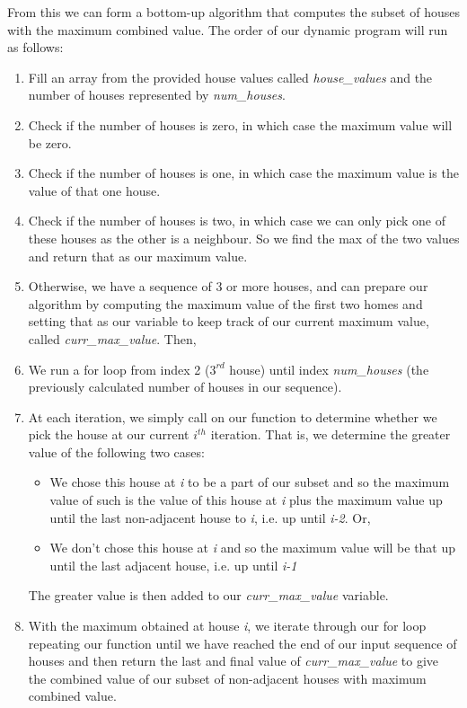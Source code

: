 \documentclass[11pt, oneside]{article}   	%
\begin{document}
\begin{enumerate}
\begin{enumerate}
		From this we can form a bottom-up algorithm that computes the subset of houses with the maximum combined value. The order of our dynamic program will run as follows:
		\begin{enumerate}
			\item Fill an array from the provided house values called \textit{house\_values} and the number of houses represented by \textit{num\_houses}.
			\item Check if the number of houses is zero, in which case the maximum value will be zero.
			\item Check if the number of houses is one, in which case the maximum value is the value of that one house.
			\item Check if the number of houses is two, in which case we can only pick one of these houses as the other is a neighbour. So we find the max of the two values and return that as our maximum value.
			\newpage
			\item Otherwise, we have a sequence of 3 or more houses, and can prepare our algorithm by computing the maximum value of the first two homes and setting that as our variable to keep track of our current maximum value, called \textit{curr\_max\_value}. Then,
			\item We run a for loop from index 2 ($3^{rd}$ house) until index \textit{num\_houses} (the previously calculated number of houses in our sequence).
			\item At each iteration, we simply call on our function to determine whether we pick the house at our current $i^{th}$ iteration. That is, we determine the greater value of the following two cases:
			\begin{itemize}
				\item We chose this house at \textit{i} to be a part of our subset and so the maximum value of such is the value of this house at \textit{i} plus the maximum value up until the last non-adjacent house to \textit{i}, i.e. up until \textit{i-2}. Or,
				\item We don't chose this house at \textit{i} and so the maximum value will be that up until the last adjacent house, i.e. up until \textit{i-1}
			\end{itemize}
			The greater value is then added to our \textit{curr\_max\_value} variable.
			\item With the maximum obtained at house \textit{i}, we iterate through our for loop repeating our function until we have reached the end of our input sequence of houses and then return the last and final value of \textit{curr\_max\_value} to give the combined value of our subset of non-adjacent houses with maximum combined value.

\end{enumerate}
\end{enumerate}
\end{enumerate}
\end{document}

